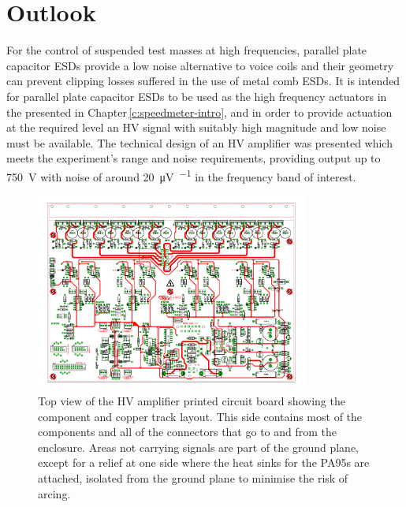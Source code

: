 \section{Outlook}
For the control of suspended test masses at high frequencies, parallel plate capacitor \glspl{ESD} provide a low noise alternative to voice coils and their geometry can prevent clipping losses suffered in the use of metal comb \glspl{ESD}. It is intended for parallel plate capacitor \glspl{ESD} to be used as the high frequency actuators in the \SSMEXPT{} presented in Chapter\,\ref{c:speedmeter-intro}, and in order to provide actuation at the required level an \gls{HV} signal with suitably high magnitude and low noise must be available. The technical design of an \gls{HV} amplifier was presented which meets the experiment's range and noise requirements, providing output up to \SI{750}{\volt} with noise of around \SI{20}{\micro\volt\per\sqrthz} in the frequency band of interest.

\clearpage
\begin{figure}
  \centering
  \includegraphics[width=0.8\textwidth]{graphics/60-hv-amp-top.pdf}
  \caption[High voltage amplifier board, top view]{\label{fig:hv-amp-top}Top view of the \gls{HV} amplifier printed circuit board showing the component and copper track layout. This side contains most of the components and all of the connectors that go to and from the enclosure. Areas not carrying signals are part of the ground plane, except for a relief at one side where the heat sinks for the PA95s are attached, isolated from the ground plane to minimise the risk of arcing.}
\end{figure}
\clearpage

